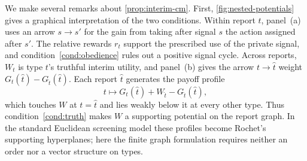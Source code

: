 \documentclass[12pt,reqno]{article}
\theoremstyle{definition} \newtheorem{example}{Example}
\theoremstyle{definition} \newtheorem{condition}{Condition}
\theoremstyle{definition} \newtheorem{corollary}{Corollary}
\theoremstyle{definition} \newtheorem{claim}{Claim}
\theoremstyle{definition} \newtheorem{definition}{Definition}
\theoremstyle{definition} \newtheorem{conjecture}{Conjecture}
\theoremstyle{definition} \newtheorem{Lemma}{Lemma}
\theoremstyle{definition} \newtheorem{lemma}{Lemma}
\theoremstyle{plain} \newtheorem{theorem}{Theorem}
\theoremstyle{definition} \newtheorem{assumption}{Assumption}
\theoremstyle{definition} \newtheorem*{assumptionnonumber}{Assumption}
\theoremstyle{definition} \newtheorem*{theoremNoNumber}{Proposition}
\theoremstyle{definition}\newtheorem{proposition}{Proposition}
\theoremstyle{definition} \newtheorem{observation}{Observation}
\theoremstyle{definition} \newtheorem*{definitionNoNumber}{Definition}
\theoremstyle{definition} \newtheorem{Definition}{Definition}
\theoremstyle{definition} \newtheorem*{DefinitionNoNumber}{Definition}
\theoremstyle{definition} \newtheorem*{fact}{Fact}
\theoremstyle{definition} \newtheorem*{property}{Property}
\theoremstyle{definition} \newtheorem{remark}{Remark}
\theoremstyle{definition}\newtheorem{romanexampleinner}{Example}
\begin{document}
We make several remarks about \cref{prop:interim-cm}. First, \cref{fig:nested-potentials} gives a graphical interpretation of the two conditions. Within report $t$, panel~(a) uses an arrow $s\to s'$ for the gain from taking after signal $s$ the action assigned after $s'$. The relative rewards $r_t$ support the prescribed use of the private signal, and condition~\eqref{cond:obedience} rules out a positive signal cycle. Across reports, $W_t$ is type $t$'s truthful interim utility, and panel~(b) gives the arrow $t\to\hat t$ weight $G_t(\hat t)-G_{\hat t}(\hat t)$. Each report $\hat t$ generates the payoff profile
\[
t\longmapsto G_t(\hat t)+W_{\hat t}-G_{\hat t}(\hat t),
\]
which touches $W$ at $t=\hat t$ and lies weakly below it at every other type. Thus condition~\eqref{cond:truth} makes $W$ a supporting potential on the report graph. In the standard Euclidean screening model these profiles become Rochet's supporting hyperplanes; here the finite graph formulation requires neither an order nor a vector structure on types.
\end{document}

